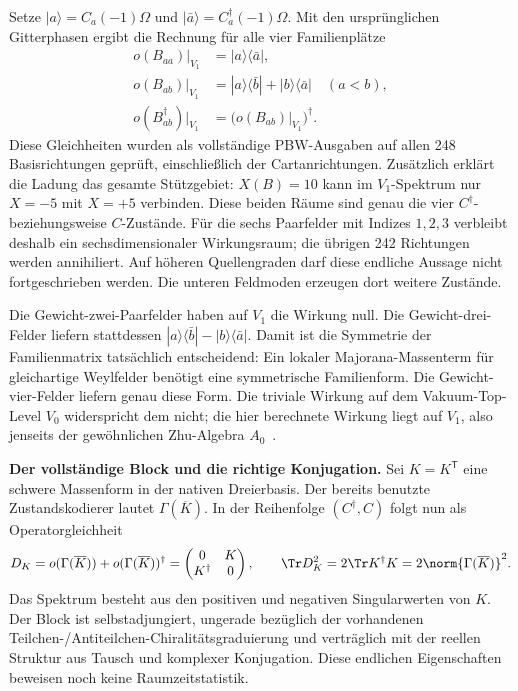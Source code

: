Setze $|a\rangle=C_a(-1)\Omega$ und
$|\bar a\rangle=C_a^\dagger(-1)\Omega$. Mit den ursprünglichen
Gitterphasen ergibt die Rechnung für alle vier Familienplätze
\begin{align}
o(B_{aa})\big|_{V_1}&=|a\rangle\langle\bar a|,\\
o(B_{ab})\big|_{V_1}&=|a\rangle\langle\bar b|
                    +|b\rangle\langle\bar a|\quad(a<b),\\
o(B_{ab}^\dagger)\big|_{V_1}&=
  \bigl(o(B_{ab})\big|_{V_1}\bigr)^\dagger.
\end{align}
Diese Gleichheiten wurden als vollständige PBW-Ausgaben auf allen
248 Basisrichtungen geprüft, einschließlich der Cartanrichtungen.
Zusätzlich erklärt die Ladung das gesamte Stützgebiet: $X(B)=10$ kann im
$V_1$-Spektrum nur $X=-5$ mit $X=+5$ verbinden. Diese beiden Räume sind
genau die vier $C^\dagger$- beziehungsweise $C$-Zustände.
Für die sechs Paarfelder mit Indizes $1,2,3$ verbleibt deshalb ein
sechsdimensionaler Wirkungsraum; die übrigen 242 Richtungen werden annihiliert.
Auf höheren Quellengraden darf diese endliche Aussage nicht fortgeschrieben
werden. Die unteren Feldmoden erzeugen dort weitere Zustände.

Die Gewicht-zwei-Paarfelder haben auf $V_1$ die Wirkung null.
Die Gewicht-drei-Felder liefern stattdessen
$|a\rangle\langle\bar b|-|b\rangle\langle\bar a|$.
Damit ist die Symmetrie der Familienmatrix tatsächlich entscheidend:
Ein lokaler Majorana-Massenterm für gleichartige Weylfelder benötigt eine
symmetrische Familienform. Die Gewicht-vier-Felder liefern genau diese
Form. Die triviale Wirkung auf dem Vakuum-Top-Level $V_0$ widerspricht
dem nicht; die hier berechnete Wirkung liegt auf $V_1$, also jenseits der
gewöhnlichen Zhu-Algebra $A_0$~\cite{barronhigherzhu}.

\textbf{Der vollständige Block und die richtige Konjugation.}
Sei $K=K^{\mathsf T}$ eine schwere Massenform in der nativen Dreierbasis.
Der bereits benutzte Zustandskodierer lautet $\Gamma(\overline K)$.
In der Reihenfolge $(C^\dagger,C)$ folgt nun als Operatorgleichheit
\begin{equation}\label{eq:sourcemajoranaoperator}
D_K=o(\Gamma(\overline K))+o(\Gamma(\overline K))^\dagger
=\begin{pmatrix}0&K\\K^\dagger&0\end{pmatrix},\qquad
\Tr D_K^2=2\Tr K^\dagger K=2\norm{\Gamma(\overline K)}^2.
\end{equation}
Das Spektrum besteht aus den positiven und negativen Singularwerten von
$K$. Der Block ist selbstadjungiert, ungerade bezüglich der vorhandenen
Teilchen-/Antiteilchen-Chiralitätsgraduierung und verträglich mit der
reellen Struktur aus Tausch und komplexer Konjugation. Diese endlichen
Eigenschaften beweisen noch keine Raumzeitstatistik.

